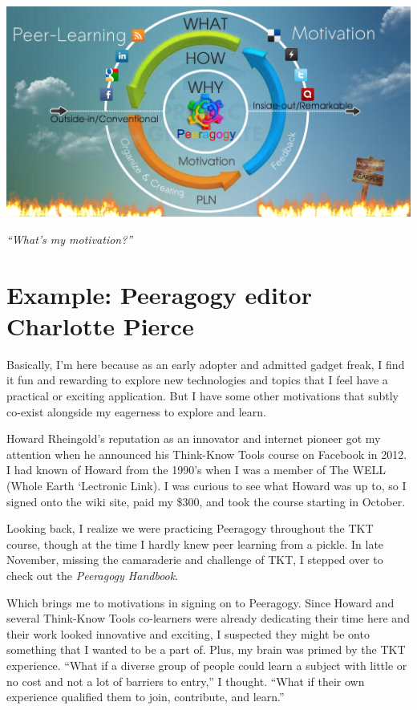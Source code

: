 \begin{center}
\includegraphics[width=.8\textwidth]{../pictures/pln-cycle.jpg}
\end{center}

\emph{``What's my motivation?''}

\section*{Example: Peeragogy editor Charlotte Pierce}

Basically, I'm here because as an early adopter and admitted gadget
freak, I find it fun and rewarding to explore new technologies and
topics that I feel have a practical or exciting application. But I have
some other motivations that subtly co-exist alongside my eagerness
to explore and learn.

Howard Rheingold's reputation as an innovator and internet pioneer got
my attention when he announced his Think-Know Tools course on Facebook
in 2012. I had known of Howard from the 1990's when I was a member of
The WELL (Whole Earth `Lectronic Link). I was curious to see what Howard
was up to, so I signed onto the wiki site, paid my \$300, and took the
course starting in October.

Looking back, I realize we were practicing Peeragogy throughout the TKT
course, though at the time I hardly knew peer learning from a pickle. In
late November, missing the camaraderie and challenge of TKT, I stepped
over to check out the \emph{Peeragogy Handbook}.

Which brings me to motivations in signing on to Peeragogy. Since Howard
and several Think-Know Tools co-learners were already dedicating their
time here and their work looked innovative and exciting, I suspected
they might be onto something that I wanted to be a part of. Plus, my
brain was primed by the TKT experience. ``What if a diverse group of
people could learn a subject with little or no cost and not a lot of
barriers to entry,'' I thought. ``What if their own experience qualified
them to join, contribute, and learn.''

